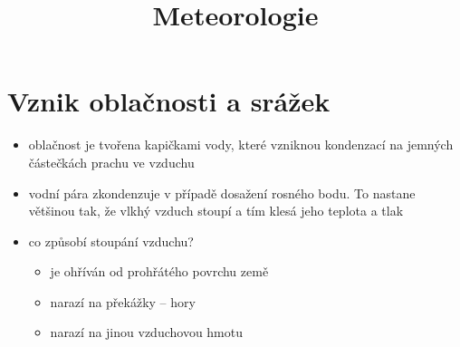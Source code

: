 \title{Meteorologie}


\section{Vznik oblačnosti a srážek}
\begin{itemize}
\item oblačnost je tvořena kapičkami vody, které vzniknou kondenzací na jemných částečkách prachu ve vzduchu
\item vodní pára zkondenzuje v případě dosažení rosného bodu. To nastane většinou tak, že vlkhý vzduch stoupí a tím klesá jeho teplota a tlak
\item co způsobí stoupání vzduchu?
\begin{itemize}
\item je ohříván od prohřátého povrchu země
\item narazí na překážky -- hory
\item narazí na jinou vzduchovou hmotu
\end{itemize}
\end{itemize}

	